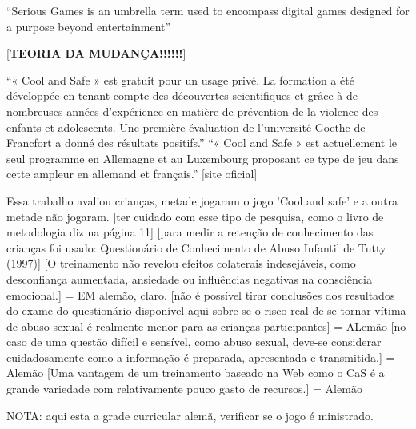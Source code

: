 ``Serious Games is an umbrella term used to encompass digital games designed for a purpose beyond entertainment''\cite{dip2016advancing}







[\textbf{TEORIA DA MUDANÇA!!!!!!}]

``« Cool and Safe » est gratuit pour un usage privé. La formation a été développée en tenant compte des découvertes scientifiques et grâce à de nombreuses années d'expérience en matière de prévention de la violence des enfants et adolescents. Une première évaluation de l'université Goethe de Francfort a donné des résultats positifs.'' ``« Cool and Safe » est actuellement le seul programme en Allemagne et au Luxembourg proposant ce type de jeu dans cette ampleur en allemand et français.'' [site oficial]

Essa trabalho avaliou crianças, metade jogaram o jogo 'Cool and safe' e a outra metade não jogaram. \cite{fingerleabschlussbericht} [ter cuidado com esse tipo de pesquisa, como o livro de metodologia diz na página 11]
[para medir a retenção de conhecimento das crianças foi usado: Questionário de Conhecimento de Abuso Infantil de Tutty (1997)]
[O treinamento não revelou efeitos colaterais indesejáveis, como desconfiança aumentada, ansiedade ou influências negativas na consciência emocional.] = EM alemão, claro.
[não é possível tirar conclusões dos resultados do exame do questionário disponível aqui sobre se o risco real de se tornar vítima de abuso sexual é realmente menor para as crianças participantes] = ALemão
[no caso de uma questão difícil e sensível, como abuso sexual, deve-se considerar cuidadosamente como a informação é preparada, apresentada e transmitida.] = Alemão
[Uma vantagem de um treinamento baseado na Web como o CaS é a grande variedade com relativamente pouco gasto de recursos.] = Alemão

NOTA: aqui esta a grade curricular alemã, verificar se o jogo é ministrado.



